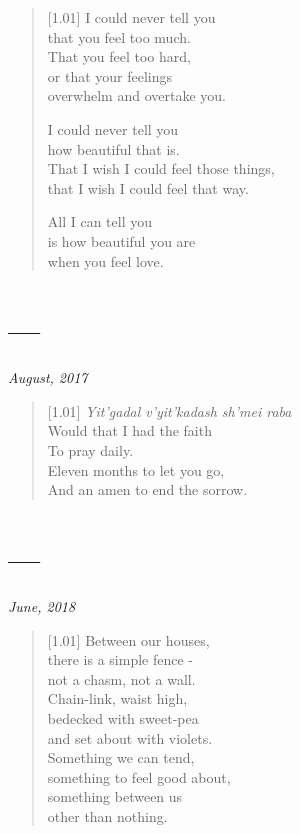 \begin{verse}[1.01\textwidth]
I could never tell you\\
that you feel too much.\\
That you feel too hard,\\
or that your feelings\\
overwhelm and overtake you.

I could never tell you\\
how beautiful that is.\\
That I wish I could feel those things,\\
that I wish I could feel that way.

All I can tell you\\
is how beautiful you are\\
when you feel love.
\end{verse}
\newpage

\section*{---}

\hfill\textit{August, 2017}

\begin{verse}[1.01\textwidth]
\textit{Yit'gadal v'yit'kadash sh'mei raba}\\
Would that I had the faith\\
To pray daily.\\
Eleven months to let you go,\\
And an amen to end the sorrow.
\end{verse}
\newpage

\section*{---}

\hfill\textit{June, 2018}

\begin{verse}[1.01\textwidth]
  Between our houses,\\
  there is a simple fence -\\
  not a chasm, not a wall.\\
  Chain-link, waist high,\\
  bedecked with sweet-pea\\
  and set about with violets.\\
  Something we can tend,\\
  something to feel good about,\\
  something between us\\
  other than nothing.
\end{verse}
\newpage

